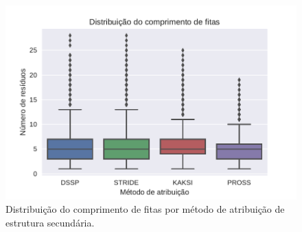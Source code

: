 \begin{figure}
  \includegraphics[width=\linewidth]{../figures/distribuicao_comprimento_fitas.pdf}
  \caption{Distribuição do comprimento de fitas por método de atribuição de estrutura secundária.}
  \label{fig:distribuicao_comprimento_fitas}
\end{figure}